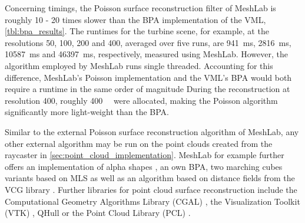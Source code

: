 Concerning timings, the Poisson surface reconstruction filter of MeshLab is roughly 10 - 20 times slower than the BPA implementation of the VML, \cf \cref{tbl:bpa_results}.
The runtimes for the turbine scene, for example, at the resolutions 50, 100, 200 and 400, averaged over five runs, are \SI{941}{\milli\second}, \SI{2816}{\milli\second}, \SI{10587}{\milli\second} and \SI{46397}{\milli\second}, respectively, measured using MeshLab.
However, the algorithm employed by MeshLab runs single threaded.
Accounting for this difference, MeshLab's Poisson implementation and the VML's BPA would both require a runtime in the same order of magnitude
During the reconstruction at resolution 400, roughly \SI{400}{\mebi\byte} were allocated, making the Poisson algorithm significantly more light-weight than the BPA.

Similar to the external Poisson surface reconstruction algorithm of MeshLab, any other external algorithm may be run on the point clouds created from the raycaster in \cref{sec:point_cloud_implementation}.
MeshLab for example further offers an implementation of alpha shapes \cite{alpha_shape}, an own BPA, two marching cubes variants based on MLS \cite{meshlab_mc_mls_1, meshlab_mc_mls_2} as well as an algorithm based on distance fields from the VCG library \cite{vcg}.
Further libraries for point cloud surface reconstruction include the Computational Geometry Algorithms Library (CGAL) \cite{cgal}, the Visualization Toolkit (VTK) \cite{vtk}, QHull \cite{qhull} or the Point Cloud Library (PCL) \cite{pcl}.
